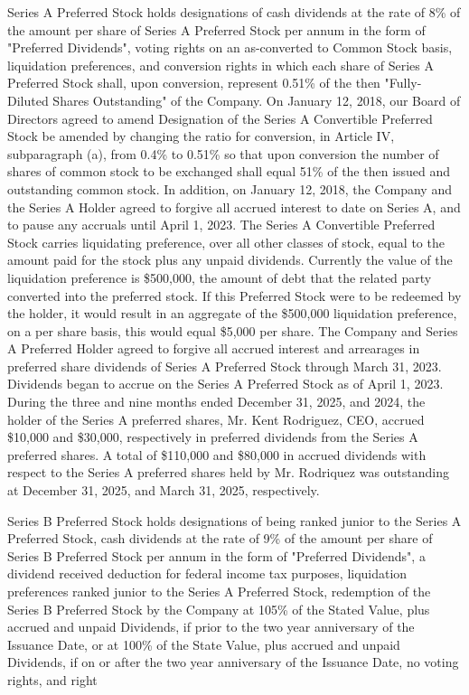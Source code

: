 \documentclass[11pt,a4paper]{article}
\begin{document}
Series A Preferred Stock holds designations of cash dividends at the rate of 8\% of the amount per share of Series A Preferred Stock per annum in the form of "Preferred Dividends", voting rights on an as-converted to Common Stock basis, liquidation preferences, and conversion rights in which each share of Series A Preferred Stock shall, upon conversion, represent 0.51\% of the then "Fully-Diluted Shares Outstanding" of the Company. On January 12, 2018, our Board of Directors agreed to amend Designation of the Series A Convertible Preferred Stock be amended by changing the ratio for conversion, in Article IV, subparagraph (a), from 0.4\% to 0.51\% so that upon conversion the number of shares of common stock to be exchanged shall equal 51\% of the then issued and outstanding common stock. In addition, on January 12, 2018, the Company and the Series A Holder agreed to forgive all accrued interest to date on Series A, and to pause any accruals until April 1, 2023. The Series A Convertible Preferred Stock carries liquidating preference, over all other classes of stock, equal to the amount paid for the stock plus any unpaid dividends. Currently the value of the liquidation preference is \$500,000, the amount of debt that the related party converted into the preferred stock. If this Preferred Stock were to be redeemed by the holder, it would result in an aggregate of the \$500,000 liquidation preference, on a per share basis, this would equal \$5,000 per share. The Company and Series A Preferred Holder agreed to forgive all accrued interest and arrearages in preferred share dividends of Series A Preferred Stock through March 31, 2023. Dividends began to accrue on the Series A Preferred Stock as of April 1, 2023. During the three and nine months ended December 31, 2025, and 2024, the holder of the Series A preferred shares, Mr. Kent Rodriguez, CEO, accrued \$10,000 and \$30,000, respectively in preferred dividends from the Series A preferred shares. A total of \$110,000 and \$80,000 in accrued dividends with respect to the Series A preferred shares held by Mr. Rodriquez was outstanding at December 31, 2025, and March 31, 2025, respectively.

Series B Preferred Stock holds designations of being ranked junior to the Series A Preferred Stock, cash dividends at the rate of 9\% of the amount per share of Series B Preferred Stock per annum in the form of "Preferred Dividends", a dividend received deduction for federal income tax purposes, liquidation preferences ranked junior to the Series A Preferred Stock, redemption of the Series B Preferred Stock by the Company at 105\% of the Stated Value, plus accrued and unpaid Dividends, if prior to the two year anniversary of the Issuance Date, or at 100\% of the State Value, plus accrued and unpaid Dividends, if on or after the two year anniversary of the Issuance Date, no voting rights, and right
\end{document}
